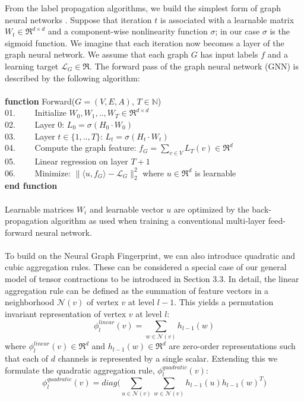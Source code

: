 \documentclass[a4paper]{article}
\begin{document}
From the label propagation algorithms, we build the simplest form of graph neural networks \cite{Steven, Duvenaud, Thomas}. Suppose that iteration $t$ is associated with a learnable matrix $W_t \in \Re^{d \times d}$ and a component-wise nonlinearity function $\sigma$; in our case $\sigma$ is the sigmoid function. We imagine that each iteration now becomes a layer of the graph neural network. We assume that each graph $G$ has input labels $f$ and a learning target $\mathcal{L}_G \in \Re$. The forward pass of the graph neural network (GNN) is described by the following algorithm: \\ \\
\textbf{function} Forward($G = (V, E, A)$, $T \in \mathbb{N}$) \\
01. \ \ \ \ Initialize $W_0, W_1, .., W_T \in \Re^{d \times d}$ \\
02. \ \ \ \ Layer $0$: $L_0 = \sigma(H_0 \cdot W_0)$ \\
03. \ \ \ \ Layer $t \in \{1, .., T\}$: $L_t = \sigma(H_t \cdot W_t)$ \\
04. \ \ \ \ Compute the graph feature: $f_G = \sum_{v \in V} L_T(v) \in \Re^d$ \\
05. \ \ \ \ Linear regression on layer $T + 1$ \\
06. \ \ \ \ Minimize: $\|\langle u, f_G \rangle - \mathcal{L}_G\|_2^2$ where $u \in \Re^d$ is learnable \\
\textbf{end function} \\ \\
Learnable matrices $W_i$ and learnable vector $u$ are optimized by the back-propagation algorithm as used when training a conventional multi-layer feed-forward neural network. \\ \\
To build on the Neural Graph Fingerprint, we can also introduce quadratic and cubic aggregation rules. These can be considered a special case of our general model of tensor contractions to be introduced in Section 3.3. In detail, the linear aggregation rule can be defined as the summation of feature vectors in a neighborhood $\mathcal{N}(v)$ of vertex $v$ at level $l - 1$. This yields a permutation invariant representation of vertex $v$ at level $l$:
$$\phi_l^{linear}(v) = \sum\limits_{w \in \mathcal{N}(v)} h_{l - 1}(w)$$
where $\phi_l^{linear}(v) \in \Re^d$ and $h_{l - 1}(w) \in \Re^d$ are zero-order representations such that each of $d$ channels is represented by a single scalar. Extending this we formulate the quadratic aggregation rule, $\phi_l^{quadratic}(v)$:
$$\phi_l^{quadratic}(v) = diag \bigg(\sum\limits_{u \in \mathcal{N}(v)} \sum\limits_{w \in \mathcal{N}(v)} h_{l - 1}(u) h_{l - 1}(w)^T \bigg)$$
\end{document}
